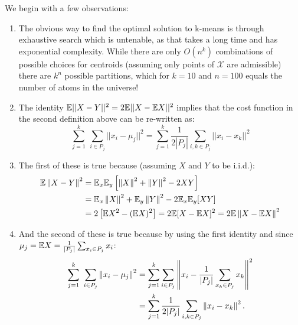 \noindent We begin with a few observations:
\begin{enumerate}
\item The obvious way to find the optimal solution to k-means is
  through exhaustive search which is untenable, as that takes a long
  time and has exponential complexity. While there are only $O(n^k)$
  combinations of possible choices for centroids (assuming only points
  of $\mathcal{X}$ are admissible) there are $k^n$ possible
  partitions, which for $k=10$ and $n=100$ equals the number of atoms
  in the universe! 
\item The identity $\mathbb{E} || X - Y ||^2 = 2 \mathbb{E} || X- \mathbb{E} X ||^2$ implies
  that the cost function in the second definition above can be
  re-written as:  $$\sum_{j=1}^{k} \ \sum_{i\in P_j} || x_i - \mu_j ||
  ^2 = \sum_{j=1}^{k} \frac{1}{2 |P_j|} \sum_{i,k \in P_j} || x_i -
  x_k || ^2 $$ 
\item The first of these is true because (assuming $X$ and $Y$ to be
  i.i.d.): 
\begin{align*}
  \mathbb{E}\left\lVert X - Y\right\rVert^2 &= \mathbb{E}_x \mathbb{E}_{y} \left[\left\lVert X\right\rVert^2 + \left\lVert Y\right\rVert^2 - 2
    XY \right] \\ 
  &= \mathbb{E}_x \left\lVert X\right\rVert^2 + \mathbb{E}_y\left\lVert Y\right\rVert^2 -2 \mathbb{E}_x \mathbb{E}_y [ X Y ] \\
  &= 2 \left[ \mathbb{E} X^2 - (\mathbb{E} X)^2\right] = 2 \mathbb{E} [ X - \mathbb{E} X ]^2 = 2
  \mathbb{E}\left\lVert X- \mathbb{E} X\right\rVert^2 
\end{align*}
\item And the second of these is true because by using the first
  identity and since $\mu_j = \mathbb{E} X = \frac{1}{|P_j|} \sum_{x_i \in
    P_j} x_i$: 
\begin{align*}
	\sum_{j=1}^{k} \ \sum_{i\in P_j} \left\lVert x_i - \mu_j\right\rVert^2 &=
        \sum_{j=1}^{k}  \sum_{i\in P_j} \left\lVert x_i - \frac{1}{|P_j|}
        \sum_{x_k \in P_j} x_k\right\rVert^2 \\
        & = \sum_{j=1}^{k} \frac{1}{2 |P_j|} \sum_{i,k \in P_j}
        \left\lVert x_i - x_k\right\rVert^2.
\end{align*}
\end{enumerate}

